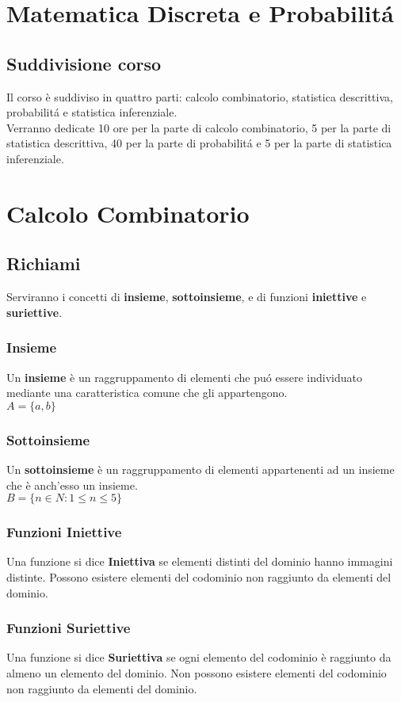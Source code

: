 \documentclass[11pt]{article}
\begin{document}
    \section*{\huge \centering Matematica Discreta e Probabilit\'a }
     \subsection*{Suddivisione corso} 
        Il corso \`e suddiviso in quattro parti: calcolo combinatorio,
        statistica descrittiva, probabilit\'a e statistica inferenziale. \\
        Verranno dedicate 10 ore per la parte di calcolo combinatorio, 5 
        per la parte di statistica descrittiva, 40 per la parte di probabilit\'a e 5 per la parte di statistica inferenziale.
   \section{Calcolo Combinatorio}
    \subsection{Richiami}
        Serviranno i concetti di \textbf{insieme},\textbf{ sottoinsieme}, e di funzioni \textbf{iniettive} e \textbf{suriettive}.
        \subsubsection{Insieme}
            Un \textbf{insieme} \`e un raggruppamento di elementi che pu\'o essere individuato mediante una caratteristica comune che gli appartengono.\\
            $A=\{a,b\}$
        \subsubsection{Sottoinsieme}
            Un \textbf{sottoinsieme} \`e un raggruppamento di elementi appartenenti ad un insieme che \`e anch'esso un insieme.\\
            $B=\{n \in N : 1\leq n \leq 5 \} $ 
        \subsubsection{Funzioni Iniettive}
            Una funzione si dice \textbf{Iniettiva} se elementi distinti del dominio hanno immagini distinte. Possono esistere elementi del codominio non raggiunto da elementi del dominio.
        \subsubsection{Funzioni Suriettive}
            Una funzione si dice \textbf{Suriettiva} se ogni elemento del codominio \`e raggiunto da almeno un elemento del dominio. Non possono esistere elementi del codominio non raggiunto da elementi del dominio.
\end{document}
